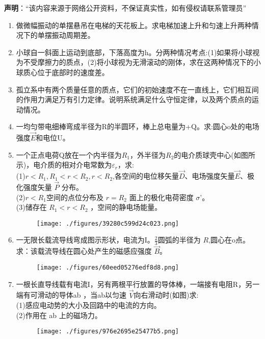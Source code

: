 
\textbf{声明}：“该内容来源于网络公开资料，不保证真实性，如有侵权请联系管理员”
\begin{enumerate}
\item 做微幅振动的单摆悬吊在电梯的天花板上。求电梯加速上升和匀速上升两种情况下的单摆振动周期差。
\item 小球自一斜面上运动到底部，下落高度为h。分两种情况考点:(1)如果将小球视为不受摩擦力的质点，(2)将小球视为无滑滚动的刚体，求在这两种情况下的小球质心位于底部时的速度差。
\item 孤立系中有两个质量任意的质点，它们的初始速度不在一直线上，它们相互间的作用力满足万有引力定律。说明系统满足什么守恒定律，以及两个质点的运动情况。
\item 一均匀带电细棒弯成半径为R的半圆环，棒上总电量为+Q。求:圆心o处的电场强度$\vec E$和电位U。
\item 一个正点电荷Q放在一个内半径为$R_1$，外半径为$R_2$的电介质球壳中心(如图所示)，电介质的相对介电常数为$\varepsilon_r$，求:\\
(1)$r<R_1,R_1<r<R_2,r<R_2$,各空间的电位移矢量$\vec D$、电场强度矢量$\vec{E}$、极化强度矢量 $\vec P$ 分布。\\
(2)$r<R_1$空间的点位分布及 $r=R_2$ 面上的极化电荷密度 $\sigma$'。\\
(3)储存在 $R_1<r<R_2$ ，空间的静电场能量。
\begin{figure}[ht]
\centering
\texttt{[image: ./figures/39280c599d24c023.png]}
\caption{} \label{fig_SSD103_2}
\end{figure}
\item 一无限长载流导线弯成图示形状，电流为I。$\frac{2}{3}$圆弧的半径为 $R$,圆心在o点。求：该载流导线在圆心处产生的磁感应强度 $\vec B$。
\begin{figure}[ht]
\centering
\texttt{[image: ./figures/60eed05276edf8d8.png]}
\caption{} \label{fig_SSD103_3}
\end{figure}
\item 一根长直导线载有电流I，另有两根平行放置的导体棒，一端接有电阻R，另一端有可滑动的导体ab ，当ab以匀速 $\vec V$向右滑动时(如图)求:\\
(1)感应电动势的大小及回路中的电流的方向。\\
(2)作用在 ab 上的磁场力。
\begin{figure}[ht]
\centering
\texttt{[image: ./figures/976e2695e25477b5.png]}
\caption{} \label{fig_SSD103_5}
\end{figure}

\end{enumerate}
